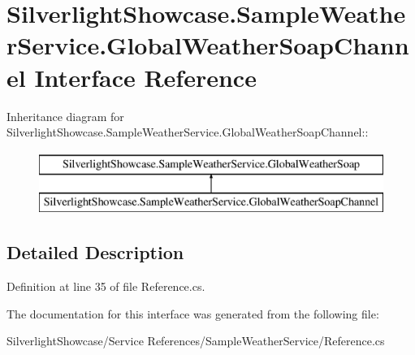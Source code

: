 \hypertarget{interface_silverlight_showcase_1_1_sample_weather_service_1_1_global_weather_soap_channel}{
\section{SilverlightShowcase.SampleWeatherService.GlobalWeatherSoapChannel Interface Reference}
\label{interface_silverlight_showcase_1_1_sample_weather_service_1_1_global_weather_soap_channel}
}
Inheritance diagram for SilverlightShowcase.SampleWeatherService.GlobalWeatherSoapChannel::\begin{figure}[H]
\begin{center}
\leavevmode
\includegraphics[height=2cm]{interface_silverlight_showcase_1_1_sample_weather_service_1_1_global_weather_soap_channel}
\end{center}
\end{figure}


\subsection{Detailed Description}


Definition at line 35 of file Reference.cs.

The documentation for this interface was generated from the following file:\begin{DoxyCompactItemize}
\item 
SilverlightShowcase/Service References/SampleWeatherService/Reference.cs\end{DoxyCompactItemize}
